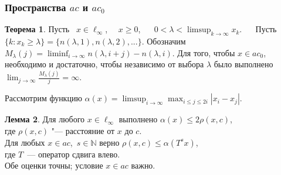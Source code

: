 \documentclass[10pt,pdf,hyperref={unicode},aspectratio=169]{beamer}
\theoremstyle{definition}
\newtheorem{llemma}{Лемма}
\newtheorem{ttheorem}[llemma]{Теорема}
\begin{document}


\begin{frame}
	\frametitle{Пространства $ac$ и $ac_0$}


	\vspace{0.4em}
	\begin{ttheorem}
		Пусть ~$x\in\ell_\infty$,~~ $x \geq 0$,
		~~
		$\displaystyle
			0<\lambda < \limsup_{k\to\infty} x_k
			.
		$
		~~
		Пусть $\{k: x_k \geq \lambda \} = \{n(\lambda,1),n(\lambda,2),...\}$.
		Обозначим
		$\displaystyle
			M_{\lambda}(j) = \liminf_{i\to\infty} n(\lambda,i+j) - n(\lambda,i)
			.
		$
		Для того, чтобы $x\in ac_0$, необходимо и достаточно, чтобы
		независимо от выбора $\lambda$ было выполнено
		$\displaystyle
			\lim_{j \to \infty} \frac{M_{\lambda}(j)}{j} = \infty
			.
		$
	\end{ttheorem}


	\vspace{0.8em}
	Рассмотрим функцию
	$\displaystyle
		\alpha(x) = \limsup_{i\to\infty} \max_{i \leq j \leq 2i} |x_i-x_j|
	$.


	\begin{llemma}
		Для любого $x\in\ell_\infty$
		выполнено
		$
			\alpha(x) \leq 2\rho(x, c)
		$,
		\\
		где $\rho(x,c)$ "--- расстояние от $x$ до $c$.
		\\
		Для любых $x\in ac$,~$s\in\mathbb{N}$ верно
		$
			\rho(x,c)\leq \alpha(T^s x)
		$,
		\\
		где $T$~--- оператор сдвига влево.%
		\\
		Обе оценки точны;
		условие $x\in ac$ важно.
	\end{llemma}

\end{frame}
\end{document}
